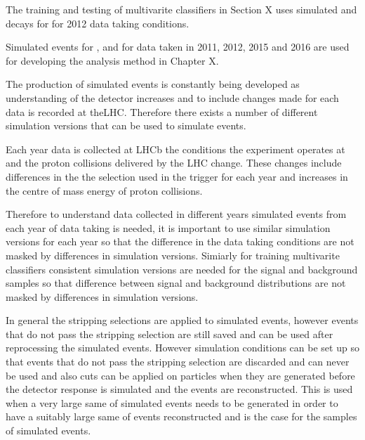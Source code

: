 The training and testing of multivarite classifiers in Section X uses simulated \bsmumu and \bbbarmumux decays for for 2012 data taking conditions.

Simulated events for \bsmumu, \bskk and \bdkpi for data taken in 2011, 2012, 2015 and 2016 are used for developing the analysis method in Chapter X. 

The production of simulated events is constantly being developed as understanding of the detector increases and to include changes made for each data is recorded at theLHC. Therefore there exists a number of different simulation versions that can be used to simulate events.

Each year data is collected at LHCb the conditions the experiment operates at and the proton collisions delivered by the LHC change. These changes include differences in the the selection used in the trigger for each year and increases in the centre of mass energy of proton collisions. 

Therefore to understand data collected in different years simulated events from each year of data taking is needed, it is important to use similar simulation versions for each year so that the difference in the data taking conditions are not masked by differences in simulation versions. Simiarly for training multivarite classifiers consistent simulation versions are needed for the signal and background samples so that difference between signal and background distributions are not masked by differences in simulation versions.

In general the stripping selections are applied to simulated events, however events that do not pass the stripping selection are still saved and can be used after reprocessing the simulated events. However simulation conditions can be set up so that events that do not pass the stripping selection are discarded and can never be used and also cuts can be applied on particles when they are generated before the detector response is simulated and the events are reconstructed. This is used when a very large same of simulated events needs to be generated in order to have a suitably large same of events reconstructed and is the case for the samples of \bbbarmumux simulated events.


